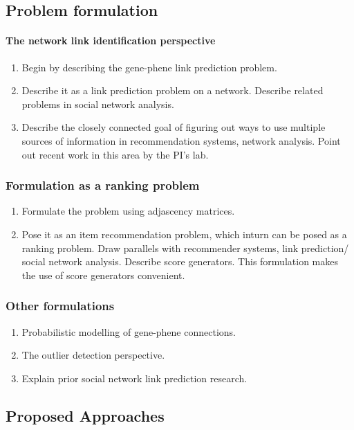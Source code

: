 \documentclass[11pt]{article}
\begin{document}
\subsection{Problem formulation}
\paragraph*{The network link identification perspective}
\begin{enumerate}
  \item Begin by describing the gene-phene link prediction problem.
  \item Describe it as a link prediction problem on a network.
  \subitem Describe related problems in social network analysis.
  \item Describe the closely connected goal of figuring out ways to use multiple sources of information in recommendation systems, network analysis.
  \subitem Point out recent work in this area by the PI's lab.
\end{enumerate}

\subsubsection{Formulation as a ranking problem}
\begin{enumerate}
  \item Formulate the problem using adjascency matrices.
  \item Pose it as an item recommendation problem, which inturn can be posed as a ranking problem.
  \subitem Draw parallels with recommender systems, link prediction/ social network analysis.
  \subitem Describe score generators. This formulation makes the use of score generators convenient.
\end{enumerate}

\subsubsection{Other formulations}
\begin{enumerate}
 \item Probabilistic modelling of gene-phene connections.
 \item The outlier detection perspective.
 \item Explain prior social network link prediction research.
\end{enumerate}



\subsection{Proposed Approaches}
\end{document}
